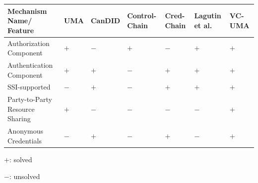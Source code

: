 \documentclass[conference, dvipdfmx]{IEEEtran} %
\begin{document}
\begin{sloppypar}
\begin{table}[H]
\begin{center}
  \begin{threeparttable} %
    \begin{tabular}{p{1.5cm} >{\centering\arraybackslash}p{0.4cm} >{\centering\arraybackslash}p{0.6cm} >{\centering\arraybackslash}p{0.8cm} >{\centering\arraybackslash}p{0.8cm} >{\centering\arraybackslash}p{0.8cm} >{\centering\arraybackslash}p{0.8cm}}
    \hline
    Mechanism Name/ Feature & UMA & CanDID \cite{CanDID} & Control-Chain \cite{Controlchain}
    & Cred-Chain \cite{Selective_Disclosure_paper} & Lagutin et al. \cite{VC_Oauth} 	& VC-UMA \\ \hline\hline
    Authorization Component & $+$ & $-$ & $+$ & $-$ & $+$ & $+$ \\ \hline
    Authentication Component & $+$ & $+$ & $-$ & $+$ & $+$ & $+$ \\ \hline
    SSI-supported  & $-$ & $+$ &  $-$ & $+$ & $+$ & $+$ \\ \hline
    Party-to-Party Resource Sharing & $+$ &  $-$  & $-$ & $-$ & $-$ & $+$ \\ \hline
    Anonymous Credentials & $-$ & $+$  & $-$ & $+$  & $-$  & $+$ \\ \hline
    \end{tabular}
    \begin{tablenotes} %
      \item $+$: solved%
      \item $-$: unsolved%
      \end{tablenotes} %
  \end{threeparttable} %
  \end{center}

\end{table}


\end{sloppypar}
\end{document}
